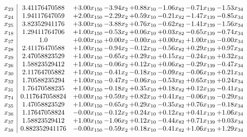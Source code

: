 \documentclass[8pt]{article}
\begin{document}
\[\begin{array}{c| c c@{\hskip 2pt} c@{\hskip 2pt} c@{\hskip 2pt} c@{\hskip 2pt} c@{\hskip 2pt} c@{\hskip 2pt} }
 x_{23}   &  3.41176470588 & +  3.00 x_{150} & -3.94 x_{2} & +  0.88 x_{10} & -1.06 x_{82} & -0.71 x_{139} & -1.53 x_{34}\\
 x_{24}   &  1.94117647059 & +  2.00 x_{150} & -2.29 x_{2} & +  0.59 x_{10} & -0.21 x_{82} & -1.47 x_{139} & -0.85 x_{34}\\
 x_{25}   &  3.82352941176 & +  3.00 x_{150} & -3.88 x_{2} & +  0.76 x_{10} & -0.62 x_{82} & -1.41 x_{139} & -1.56 x_{34}\\
 x_{18}   &  1.29411764706 & +  1.00 x_{150} & -0.53 x_{2} & +  0.06 x_{10} & +  0.03 x_{82} & -0.65 x_{139} & -0.74 x_{34}\\
 x_{27}   &  1.0 & +  0.00 x_{150} & +  0.00 x_{2} & -0.00 x_{10} & +  0.00 x_{82} & +  1.00 x_{139} & -0.00 x_{34}\\
 x_{28}   &  2.41176470588 & +  1.00 x_{150} & -0.94 x_{2} & -0.12 x_{10} & -0.56 x_{82} & +  0.29 x_{139} & +  0.97 x_{34}\\
 x_{29}   &  2.47058823529 & +  1.00 x_{150} & -0.65 x_{2} & +  0.29 x_{10} & +  0.15 x_{82} & -0.24 x_{139} & +  0.32 x_{34}\\
 x_{26}   &  1.58823529412 & +  1.00 x_{150} & -0.06 x_{2} & +  0.12 x_{10} & +  0.06 x_{82} & -0.29 x_{139} & -0.47 x_{34}\\
 x_{30}   &  2.11764705882 & +  1.00 x_{150} & -0.41 x_{2} & -0.18 x_{10} & -0.09 x_{82} & -0.06 x_{139} & +  0.21 x_{34}\\
 x_{32}   &  1.70588235294 & +  1.00 x_{150} & -0.47 x_{2} & -0.06 x_{10} & -0.53 x_{82} & +  0.65 x_{139} & +  0.24 x_{34}\\
 x_{31}   &  1.76470588235 & +  1.00 x_{150} & -0.18 x_{2} & +  0.35 x_{10} & +  0.18 x_{82} & +  0.12 x_{139} & -0.41 x_{34}\\
 x_{74}   &  0.117647058824 & +  0.00 x_{150} & +  0.59 x_{2} & +  0.82 x_{10} & +  0.41 x_{82} & -0.06 x_{139} & -0.29 x_{34}\\
 x_{35}   &  1.47058823529 & +  1.00 x_{150} & -0.65 x_{2} & +  0.29 x_{10} & -0.35 x_{82} & +  0.76 x_{139} & -0.18 x_{34}\\
 x_{36}   &  1.17647058824 & -0.00 x_{150} & -0.12 x_{2} & +  0.24 x_{10} & +  0.12 x_{82} & +  0.41 x_{139} & +  1.06 x_{34}\\
 x_{37}   &  1.58823529412 & +  1.00 x_{150} & -1.06 x_{2} & +  0.12 x_{10} & -0.44 x_{82} & +  0.71 x_{139} & +  0.03 x_{34}\\
 x_{38}   &  0.882352941176 & -0.00 x_{150} & -0.59 x_{2} & +  0.18 x_{10} & -0.41 x_{82} & +  1.06 x_{139} & +  1.29 x_{34}\\

\end{array}\]
\end{document}
